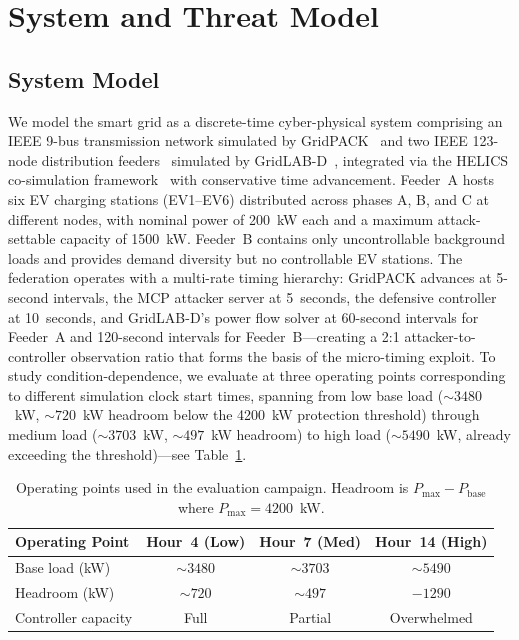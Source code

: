 \section{System and Threat Model}
\label{sec:model}

\subsection{System Model}
\label{sec:model:system}

We model the smart grid as a discrete-time cyber-physical system comprising an IEEE 9-bus transmission network simulated by GridPACK~\cite{palmer2016gridpack} and two IEEE 123-node distribution feeders~\cite{schneider2018testfeeders} simulated by GridLAB-D~\cite{chassin2014gridlabd}, integrated via the HELICS co-simulation framework~\cite{hardy2024helics} with conservative time advancement.
Feeder~A hosts six EV charging stations (EV1--EV6) distributed across phases A, B, and C at different nodes, with nominal power of 200~kW each and a maximum attack-settable capacity of 1500~kW.
Feeder~B contains only uncontrollable background loads and provides demand diversity but no controllable EV stations.
The federation operates with a multi-rate timing hierarchy: GridPACK advances at 5-second intervals, the MCP attacker server at 5~seconds, the defensive controller at 10~seconds, and GridLAB-D's power flow solver at 60-second intervals for Feeder~A and 120-second intervals for Feeder~B---creating a 2:1 attacker-to-controller observation ratio that forms the basis of the micro-timing exploit.
To study condition-dependence, we evaluate at three operating points corresponding to different simulation clock start times, spanning from low base load (${\sim}3480$~kW, ${\sim}720$~kW headroom below the 4200~kW protection threshold) through medium load (${\sim}3703$~kW, ${\sim}497$~kW headroom) to high load (${\sim}5490$~kW, already exceeding the threshold)---see Table~\ref{tab:operating-points}.

\begin{table}[t]
\caption{Operating points used in the evaluation campaign. Headroom is $P_{\max} - P_{\text{base}}$ where $P_{\max} = 4200$~kW.}
\label{tab:operating-points}
\centering
\small
\begin{tabular}{@{}lccc@{}}
\toprule
\textbf{Operating Point} & \textbf{Hour~4 (Low)} & \textbf{Hour~7 (Med)} & \textbf{Hour~14 (High)} \\
\midrule
Base load (kW)     & ${\sim}3480$ & ${\sim}3703$ & ${\sim}5490$ \\
Headroom (kW)      & ${\sim}720$  & ${\sim}497$  & $-1290$ \\
Controller capacity & Full         & Partial      & Overwhelmed \\
\bottomrule
\end{tabular}
\end{table}

